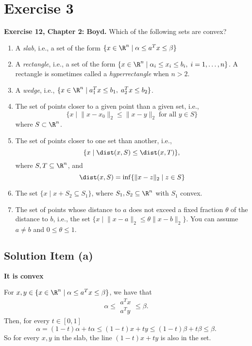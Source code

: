 

\section*{Exercise 3}

\textbf{Exercise 12, Chapter 2: Boyd.} Which of the following sets are convex?
\begin{enumerate}[label = (\alph*)]
    \item A \textit{slab}, i.e., a set of the form $\{x \in\R^n \;|\; \alpha \leq a^T x \leq \beta\}$
    \item A \textit{rectangle}, i.e., a set of the form $\{x \in \R^n \;|\; \alpha_i \leq x_i \leq b_i,\; i = 1,\ldots, n\}$. A rectangle is sometimes called a \textit{hyperrectangle} when $n>2$. 
    \item A \textit{wedge}, i.e., $\{ x \in \R^{n} \;|\; a_1^T x \leq b_1,\; a_2^T x \leq b_2\}$.
    \item The set of points closer to a given point than a given set, i.e.,
    \[ \{x \;|\; \|x-x_0\|_2 \leq \|x-y\|_2 \; \mbox{for all $y \in S$} \} \]
    where $S\subset \R^n$.
    \item The set of points closer to one set than another, i.e.,
    \[ \{x \;|\; \dist(x,S) \leq \dist(x,T)\}, \]
    where $S,T\subseteq \R^n$, and
    \[ \dist(x,S) = \inf\{\|x-z\|_2 \;|\; z\in S\} \]
    \item The set $\{x \;|\; x+S_2 \subseteq S_1\}$, where $S_1,S_2\subseteq \R^n$ with $S_1$ convex.
    \item The set of points whose distance to $a$ does not exceed a fixed fraction $\theta$ of the distance to $b$, i.e., the set $\{x \;|\; \|x - a\|_2 \leq \theta\|x - b\|_2 \}$. You can assume $a\neq b$ and $0 \leq \theta \leq 1$.
\end{enumerate}

\subsection*{Solution Item (a)}

\textbf{It is convex}

For $x,y \in \{x \in\R^n \;|\; \alpha \leq a^T x \leq \beta\}$, we have that 
\[ \alpha \leq \begin{array}{c}
    a^T x\\
    a^T y
\end{array} \leq \beta. \]
Then, for every $t \in [0,1]$
\[ \alpha = (1-t)\alpha + t\alpha \leq (1-t) x + t y \leq (1-t)\beta + t\beta \leq \beta. \]
So for every $x,y$ in the slab, the line $(1-t) x + t y$ is also in the set.


